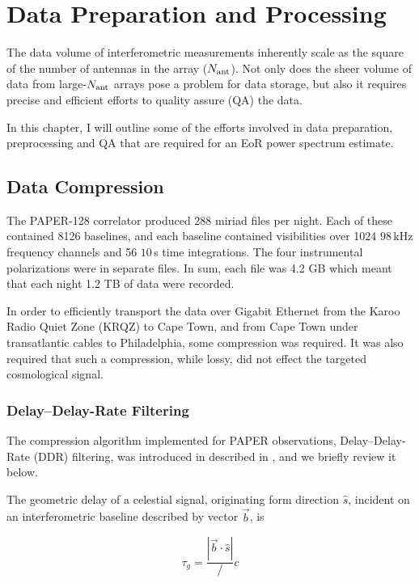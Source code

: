 \chapter{Data Preparation and Processing}
\label{chapter:data_prep_and_proc}
The data volume of interferometric measurements inherently scale as the square of the number of antennas in the array ($N_{\rm ant}$). Not only does the sheer volume of data from large-$N_{\rm ant}$ arrays pose a problem for data storage, but also it requires precise and efficient efforts to quality assure (QA) the data. 

In this chapter, I will outline some of the efforts involved in data preparation, preprocessing and QA that are required for an EoR power spectrum estimate.

\section{Data Compression}
\label{sec:data_compression}

The PAPER-128 correlator produced 288 {\sc miriad} files per night. Each of these contained 8126 baselines, and each baseline contained visibilities over 1024 $98$\,kHz frequency channels and 56 $10$\,s time integrations. The four instrumental polarizations were in separate files. In sum, each file was 4.2 GB which meant that each night 1.2 TB of data were recorded.

In order to efficiently transport the data over Gigabit Ethernet from the Karoo Radio Quiet Zone (KRQZ) to Cape Town, and from Cape Town under transatlantic cables to Philadelphia, some compression was required. It was also required that such a compression, while lossy, did not effect the targeted cosmological signal.

\subsection{Delay--Delay-Rate Filtering}

The compression algorithm implemented for PAPER observations, Delay--Delay-Rate (DDR) filtering, was introduced in \cite{ParsonsBacker.09} described in \cite{Parsons.14}, and we briefly review it below.

The geometric delay of a celestial signal, originating form direction $\hat{s}$, incident on an interferometric baseline described by vector $\vec{b}$, is

\begin{equation}
\tau_g = \frac{|\vec{b} \cdot \hat{s}|}/c
\end{equation}

